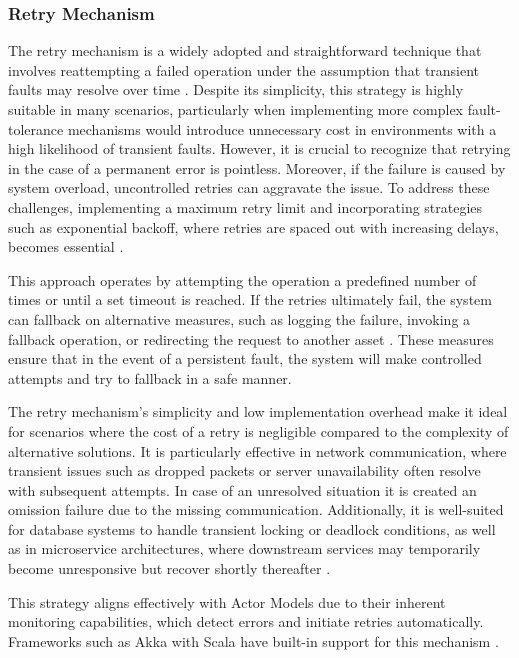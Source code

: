 \subsubsection{Retry Mechanism}

The retry mechanism is a widely adopted and straightforward technique that involves reattempting a failed operation under the assumption that transient faults may resolve over time \cite{Ledmi2018}. Despite its simplicity, this strategy is highly suitable in many scenarios, particularly when implementing more complex fault-tolerance mechanisms would introduce unnecessary cost in environments with a high likelihood of transient faults. However, it is crucial to recognize that retrying in the case of a permanent error is pointless. Moreover, if the failure is caused by system overload, uncontrolled retries can aggravate the issue. To address these challenges, implementing a maximum retry limit and incorporating strategies such as exponential backoff, where retries are spaced out with increasing delays, becomes essential \cite{Kleppmann2017,Vitillo2021}.

This approach operates by attempting the operation a predefined number of times or until a set timeout is reached. If the retries ultimately fail, the system can fallback on alternative measures, such as logging the failure, invoking a fallback operation, or redirecting the request to another asset \cite{Isukapalli2024}. These measures ensure that in the event of a persistent fault, the system will make controlled attempts and try to fallback in a safe manner.

The retry mechanism’s simplicity and low implementation overhead make it ideal for scenarios where the cost of a retry is negligible compared to the complexity of alternative solutions. It is particularly effective in network communication, where transient issues such as dropped packets or server unavailability often resolve with subsequent attempts. In case of an unresolved situation it is created an omission failure due to the missing communication. Additionally, it is well-suited for database systems to handle transient locking or deadlock conditions, as well as in microservice architectures, where downstream services may temporarily become unresponsive but recover shortly thereafter \cite{Kleppmann2017}.

This strategy aligns effectively with Actor Models due to their inherent monitoring capabilities, which detect errors and initiate retries automatically. Frameworks such as Akka with Scala have built-in support for this mechanism \cite{Isukapalli2024}.

